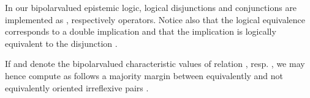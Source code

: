 \documentclass[a4paper,10pt,english]{sphinxhowto}
\begin{document}
\begin{sphinxVerbatim}[commandchars=\\\{\},numbers=left,firstnumber=1,stepnumber=1]
  
\end{sphinxVerbatim}

In our bipolar\sphinxhyphen{}valued epistemic logic, logical disjunctions and conjunctions are implemented as , respectively  operators. Notice also that the logical equivalence  corresponds to a double implication  and that the implication  is logically equivalent to the disjunction .

If  and  denote the bipolar\sphinxhyphen{}valued characteristic values of relation , resp. , we may hence compute as follows a majority margin  between equivalently and not equivalently oriented irreflexive pairs .
\end{document}
